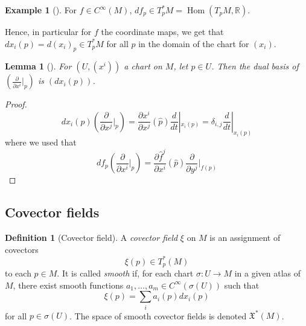 \documentclass[reqno]{amsart}
\newtheorem{lemma}[theorem]{Lemma}
\theoremstyle{definition}
\newtheorem{definition}[theorem]{Definition}
\newtheorem{example}[theorem]{Example}
\theoremstyle{remark}
\DeclareMathOperator{\Hom}{Hom}
\begin{document}
      \begin{example}[]
          For $f \in C^{\infty}(M)$,
          $df_p \in T_p^{*}M = 
          \Hom \left( T_p M, \mathbb{R} \right) $.

          Hence, in particular for $f$ the coordinate
          maps, we get that
          $dx_i(p) = d(x_i)_p \in 
          T_p^{*}M$ for all $p$ in the domain of the
          chart for $(x_i) $.
      \end{example}

      \begin{lemma}[]
          For $\left( U, (x^{i}) \right) $ a chart
          on $M$, let $p \in U$. Then
          the dual basis of
          $\left (\frac{\partial}{\partial x^{i}}|_p \right)$ is
          $\left( dx_i(p) \right)$.
      \end{lemma}

      \begin{proof}
          \[
          dx_i(p) \left( \frac{\partial}{\partial x^{j}}|_p \right) 
          = \frac{\partial x^{i}}{\partial x^{j}}(\widehat{p}) 
          \frac{d}{dt}|_{x_i(p)} =
          \delta_{i,j} \frac{d}{dt}|_{x_i(p)}
          \] 
          where we used that
          \[
          df_p\left( \frac{\partial}{\partial x^{i}}|_{p} \right) 
          = \frac{\partial \widehat{f}^{j}}{\partial x^{i}}
          (\widehat{p}) \frac{\partial}{\partial y^{j}}|_{f(p)}
          \tag{Lee (3.10)}
          \] 
      \end{proof}
      
      \subsection{Covector fields}

      \begin{definition}[Covector field]
          A \textit{covector field} $\xi$ on
          $M$ is an assignment of covectors
          \[
          \xi(p) \in T_p^{*}(M)
          \] 
          to each $p \in M$. It is called
          \textit{smooth} if, for each chart
          $\sigma \colon U \to M$ in a given atlas
          of $M$, there exist smooth functions
          $a_1, \ldots, a_m \in C^{\infty}(\sigma(U))$ such that
          \[
          \xi (p) = \sum_i a_i(p) dx_i(p)
          \] 
          for all $p \in \sigma(U)$. The space of
          smooth covector fields is denoted
          $\mathfrak{X}^{*}(M)$.
      \end{definition}
\end{document}
